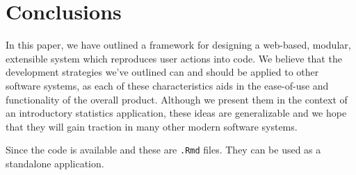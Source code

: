 \section*{Conclusions}

In this paper, we have outlined a framework for designing a web-based, modular, extensible system which reproduces user actions into \R code. We believe that the development strategies we’ve outlined can and should be applied to other software systems, as each of these characteristics aids in the ease-of-use and functionality of the overall product. Although we present them in the context of an introductory statistics application, these ideas are generalizable and we hope that they will gain traction in many other modern software systems.

Since the code is available and these are {\tt .Rmd} files. They can be used as a standalone application.
